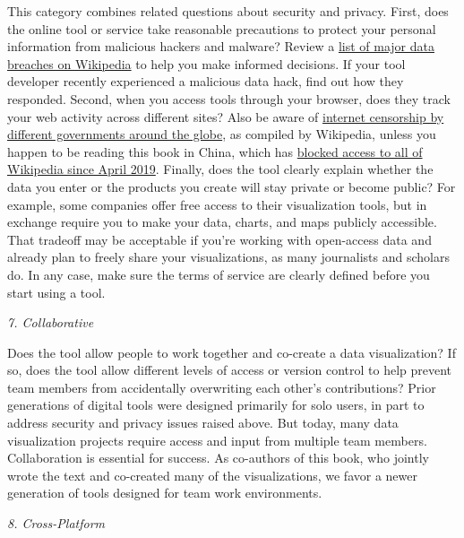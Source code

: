 \documentclass[
  english,
]{book}
\begin{document}
This category combines related questions about security and privacy. First, does the online tool or service take reasonable precautions to protect your personal information from malicious hackers and malware? Review a \href{https://en.wikipedia.org/wiki/List_of_data_breaches}{list of major data breaches on Wikipedia} to help you make informed decisions. If your tool developer recently experienced a malicious data hack, find out how they responded. Second, when you access tools through your browser, does they track your web activity across different sites? Also be aware of \href{https://en.wikipedia.org/wiki/Internet_censorship_and_surveillance_by_country}{internet censorship by different governments around the globe}, as compiled by Wikipedia, unless you happen to be reading this book in China, which has \href{https://en.wikipedia.org/wiki/Censorship_of_Wikipedia}{blocked access to all of Wikipedia since April 2019}. Finally, does the tool clearly explain whether the data you enter or the products you create will stay private or become public? For example, some companies offer free access to their visualization tools, but in exchange require you to make your data, charts, and maps publicly accessible. That tradeoff may be acceptable if you're working with open-access data and already plan to freely share your visualizations, as many journalists and scholars do. In any case, make sure the terms of service are clearly defined before you start using a tool.

\emph{7. Collaborative}

Does the tool allow people to work together and co-create a data visualization? If so, does the tool allow different levels of access or version control to help prevent team members from accidentally overwriting each other's contributions? Prior generations of digital tools were designed primarily for solo users, in part to address security and privacy issues raised above. But today, many data visualization projects require access and input from multiple team members. Collaboration is essential for success. As co-authors of this book, who jointly wrote the text and co-created many of the visualizations, we favor a newer generation of tools designed for team work environments.

\emph{8. Cross-Platform}
\end{document}
